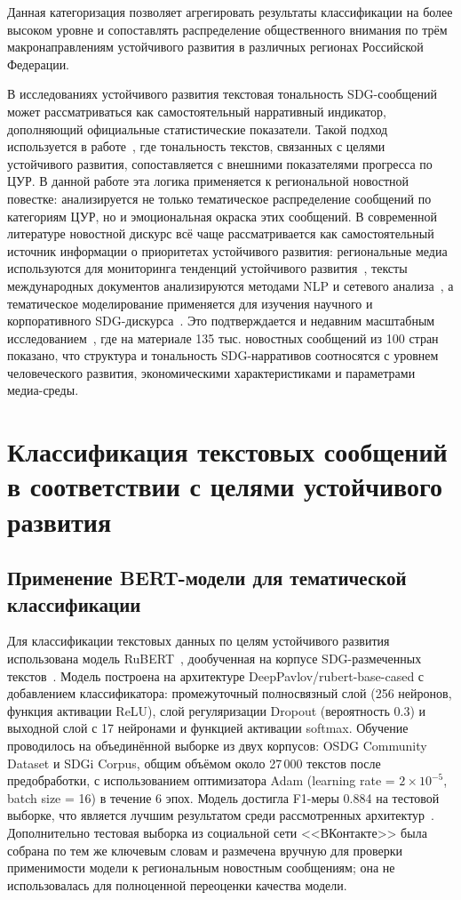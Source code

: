 \documentclass[master, och, coursework]{SCWorks1}
\begin{document}
Данная категоризация позволяет агрегировать результаты классификации на более высоком уровне и сопоставлять распределение общественного внимания по трём макронаправлениям устойчивого развития в различных регионах Российской Федерации.

В исследованиях устойчивого развития текстовая тональность SDG-сообщений может рассматриваться как самостоятельный нарративный индикатор, дополняющий официальные статистические показатели. Такой подход используется в работе~\cite{Funk2024}, где тональность текстов, связанных с целями устойчивого развития, сопоставляется с внешними показателями прогресса по ЦУР. В данной работе эта логика применяется к региональной новостной повестке: анализируется не только тематическое распределение сообщений по категориям ЦУР, но и эмоциональная окраска этих сообщений. В современной литературе новостной дискурс всё чаще рассматривается как самостоятельный источник информации о приоритетах устойчивого развития: региональные медиа используются для мониторинга тенденций устойчивого развития~\cite{Chernyshova2025}, тексты международных документов анализируются методами NLP и сетевого анализа~\cite{Smith2021}, а тематическое моделирование применяется для изучения научного и корпоративного SDG-дискурса~\cite{Arora2025,Invernici2025}. Это подтверждается и недавним масштабным исследованием~\cite{Sufi2025}, где на материале 135 тыс. новостных сообщений из 100 стран показано, что структура и тональность SDG-нарративов соотносятся с уровнем человеческого развития, экономическими характеристиками и параметрами медиа-среды.

	\section{Классификация текстовых сообщений в соответствии с целями устойчивого развития}
	
	\subsection{Применение BERT-модели для тематической классификации}

Для классификации текстовых данных по целям устойчивого развития использована модель RuBERT~\cite{Kuratov2019}, дообученная на корпусе SDG-размеченных текстов~\cite{Morozov2025}. Модель построена на архитектуре DeepPavlov/rubert-base-cased с добавлением классификатора: промежуточный полносвязный слой (256 нейронов, функция активации ReLU), слой регуляризации Dropout (вероятность 0.3) и выходной слой с 17 нейронами и функцией активации softmax. Обучение проводилось на объединённой выборке из двух корпусов: OSDG Community Dataset и SDGi Corpus, общим объёмом около 27\,000 текстов после предобработки, с использованием оптимизатора Adam (learning rate = $2 \times 10^{-5}$, batch size = 16) в течение 6 эпох. Модель достигла F1-меры 0.884 на тестовой выборке, что является лучшим результатом среди рассмотренных архитектур~\cite{Morozov2025}. Дополнительно тестовая выборка из социальной сети <<ВКонтакте>> была собрана по тем же ключевым словам и размечена вручную для проверки применимости модели к региональным новостным сообщениям; она не использовалась для полноценной переоценки качества модели.
\end{document}
